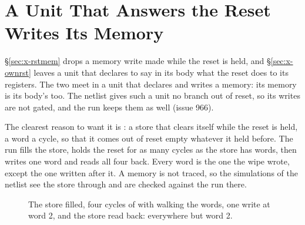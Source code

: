 \section{A Unit That Answers the Reset Writes Its Memory}
\label{sec:x-rstmemown}

\S\ref{sec:x-rstmem} drops a memory write made while the reset is
held, and \S\ref{sec:x-ownrst} leaves a unit that declares
 to say in its body what the reset does to its registers.
The two meet in a unit that declares  and writes a memory:
its memory is its body's too. The netlist gives such a unit no branch
out of reset, so its writes are not gated, and the run keeps them as
well (issue 966).

The clearest reason to want it is : a store that clears
itself while the reset is held, a word a cycle, so that it comes out
of reset empty whatever it held before. The run fills the store, holds
the reset for as many cycles as the store has words, then writes one
word and reads all four back. Every word is the one the wipe wrote,
except the one written after it. A memory is not traced, so the
simulations of the netlist see the store through  and are
checked against the run there.

\begin{figure}[htbp]
\centering

\caption{The store filled, four cycles of  with 
walking the words, one write at word 2, and the store read back:
 everywhere but word 2.}
\label{fig:x-rstmemown}
\end{figure}




